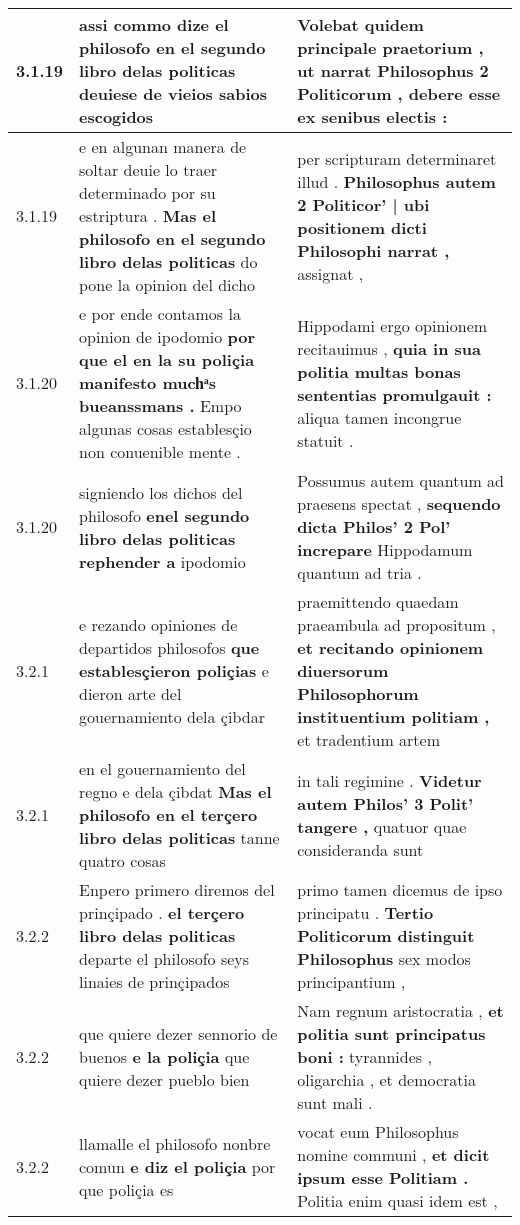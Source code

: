 \begin{tabular}{|p{1cm}|p{6.5cm}|p{6.5cm}|}
3.1.19 & assi commo dize el philosofo \textbf{ en el segundo libro delas politicas } deuiese de vieios sabios escogidos & Volebat quidem principale praetorium , \textbf{ ut narrat Philosophus 2 Politicorum , } debere esse ex senibus electis : \\\hline
3.1.19 & e en algunan manera de soltar deuie lo traer determinado por su estriptura . \textbf{ Mas el philosofo en el segundo libro delas politicas } do pone la opinion del dicho & per scripturam determinaret illud . \textbf{ Philosophus autem 2 Politicor’ | ubi positionem dicti Philosophi narrat , } assignat , \\\hline
3.1.20 & e por ende contamos la opinion de ipodomio \textbf{ por que el en la su poliçia manifesto muchͣs bueanssmans . } Empo algunas cosas establesçio non conuenible mente . & Hippodami ergo opinionem recitauimus , \textbf{ quia in sua politia multas bonas sententias promulgauit : } aliqua tamen incongrue statuit . \\\hline
3.1.20 & signiendo los dichos del philosofo \textbf{ enel segundo libro delas politicas rephender a } ipodomio & Possumus autem quantum ad praesens spectat , \textbf{ sequendo dicta Philos’ 2 Pol’ increpare } Hippodamum quantum ad tria . \\\hline
3.2.1 & e rezando opiniones de departidos philosofos \textbf{ que establesçieron poliçias } e dieron arte del gouernamiento dela çibdar & praemittendo quaedam praeambula ad propositum , \textbf{ et recitando opinionem diuersorum Philosophorum instituentium politiam , } et tradentium artem \\\hline
3.2.1 & en el gouernamiento del regno e dela çibdat \textbf{ Mas el philosofo en el terçero libro delas politicas } tanne quatro cosas & in tali regimine . \textbf{ Videtur autem Philos’ 3 Polit’ tangere , } quatuor quae consideranda sunt \\\hline
3.2.2 & Enpero primero diremos del prinçipado . \textbf{ el terçero libro delas politicas } departe el philosofo seys linaies de prinçipados & primo tamen dicemus de ipso principatu . \textbf{ Tertio Politicorum distinguit Philosophus } sex modos principantium , \\\hline
3.2.2 & que quiere dezer sennorio de buenos \textbf{ e la poliçia } que quiere dezer pueblo bien & Nam regnum aristocratia , \textbf{ et politia sunt principatus boni : } tyrannides , oligarchia , et democratia sunt mali . \\\hline
3.2.2 & llamalle el philosofo nonbre comun \textbf{ e diz el poliçia } por que poliçia es & vocat eum Philosophus nomine communi , \textbf{ et dicit ipsum esse Politiam . } Politia enim quasi idem est , \\\hline

\end{tabular}
